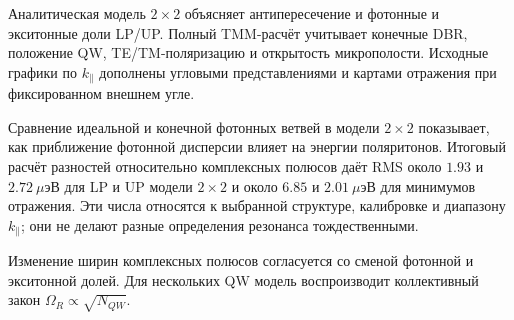\documentclass[12pt,a4paper]{article}
\begin{document}
Аналитическая модель $2\times2$ объясняет антипересечение и фотонные и
экситонные доли LP/UP. Полный TMM-расчёт учитывает конечные DBR, положение
QW, TE/TM-поляризацию и открытость микрополости. Исходные графики по
$k_\parallel$ дополнены угловыми представлениями и картами отражения при фиксированном
внешнем угле.

Сравнение идеальной и конечной фотонных ветвей в модели $2\times2$ показывает,
как приближение фотонной дисперсии влияет на энергии поляритонов. Итоговый
расчёт разностей относительно комплексных полюсов даёт RMS около
$1.93$ и $2.72\ \mu$эВ для LP и UP модели $2\times2$ и около
$6.85$ и $2.01\ \mu$эВ для минимумов отражения. Эти числа относятся к
выбранной структуре, калибровке и диапазону $k_\parallel$; они не делают
разные определения резонанса тождественными.

Изменение ширин комплексных полюсов согласуется со сменой фотонной и
экситонной долей. Для нескольких QW модель воспроизводит коллективный закон
$\Omega_R\propto\sqrt{N_{QW}}$.
\end{document}

